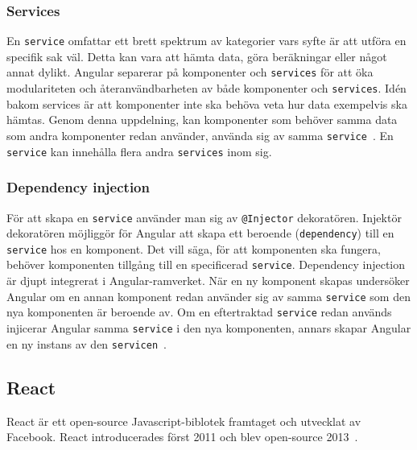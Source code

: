 
\subsubsection{Services}
\label{angular-services}
En \texttt{service} omfattar ett brett spektrum av kategorier vars syfte är att utföra en specifik sak väl. Detta kan vara att hämta data, göra beräkningar eller något annat dylikt. Angular separerar på komponenter och \texttt{services} för att öka modulariteten och återanvändbarheten av både komponenter och \texttt{services}. Idén bakom services är att komponenter inte ska behöva veta hur data exempelvis ska hämtas. Genom denna uppdelning, kan komponenter som behöver samma data som andra komponenter redan använder, använda sig av samma \texttt{service}~\cite{angular-services}. En \texttt{service} kan innehålla flera andra \texttt{services} inom sig.


\subsubsection{Dependency injection}
För att skapa en \texttt{service} använder man sig av \texttt{@Injector} dekoratören. Injektör dekoratören möjliggör för Angular att skapa ett beroende (\texttt{dependency}) till en \texttt{service} hos en komponent. Det vill säga, för att komponenten ska fungera, behöver komponenten tillgång till en specificerad \texttt{service}. Dependency injection är djupt integrerat i Angular-ramverket. När en ny komponent skapas undersöker Angular om en annan komponent redan använder sig av samma \texttt{service} som den nya komponenten är beroende av. Om en eftertraktad \texttt{service} redan används injicerar Angular samma \texttt{service} i den nya komponenten, annars skapar Angular en ny instans av den \texttt{servicen}~\cite{angular-services}.


\subsection{React}
\label{axel:react}
React är ett open-source Javascript-biblotek framtaget och utvecklat av Facebook. React introducerades först 2011 och blev open-source 2013~\cite{react-date}.



